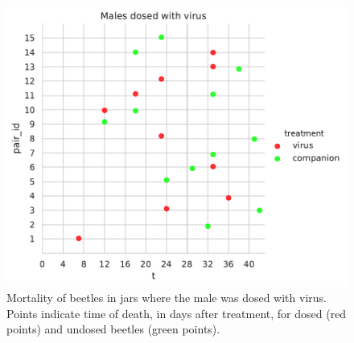 \documentclass[11pt,letterpaper]{scrartcl}
\begin{document}
\begin{figure}[h]
\centering
\includegraphics[width=\textwidth]{tm.pdf}
\caption{Mortality of beetles in jars where the male was dosed with virus. Points indicate time of death, in days after treatment, for dosed (red points) and undosed beetles (green points).}
\label{fig:tm}
\end{figure}
\end{document}
